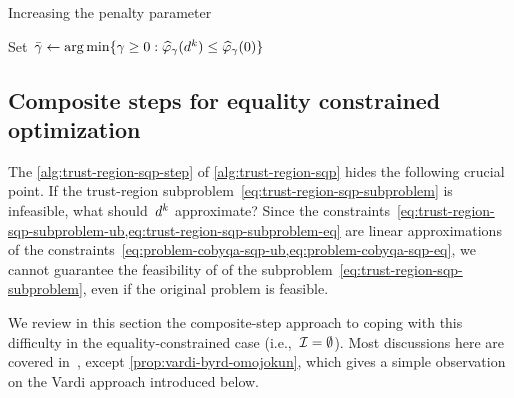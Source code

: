 \begin{algorithm}
    \caption{Increasing the penalty parameter}
    \label{alg:increase-penalty}
    \DontPrintSemicolon
    Set~$\bar{\gamma} \gets \argmin \set{\gamma \ge 0 : \meritm_{\gamma}(\step[k]) \le \meritm_{\gamma}(0)}$\;
\end{algorithm}
%

\subsection{Composite steps for equality constrained optimization}
\label{subsec:composite-step-equality}

The \cref{alg:trust-region-sqp-step} of \cref{alg:trust-region-sqp} hides the following crucial point.
If the trust-region subproblem~\cref{eq:trust-region-sqp-subproblem} is infeasible, what should~$\step[k]$ approximate?
Since the constraints~\cref{eq:trust-region-sqp-subproblem-ub,eq:trust-region-sqp-subproblem-eq} are linear approximations of the constraints~\cref{eq:problem-cobyqa-sqp-ub,eq:problem-cobyqa-sqp-eq}, we cannot guarantee the feasibility of of the subproblem~\cref{eq:trust-region-sqp-subproblem}, even if the original problem is feasible.

We review in this section the composite-step approach to coping with this difficulty in the equality-constrained case (i.e.,~$\mathcal{I} = \emptyset$).
Most discussions here are covered in~\cite[\S~15.4]{Conn_Gould_Toint_2000}, except \cref{prop:vardi-byrd-omojokun}, which gives a simple observation on the Vardi approach introduced below.

